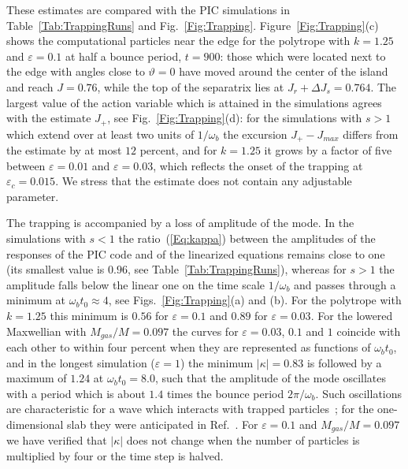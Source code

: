 These estimates are compared with the PIC simulations in Table~\ref{Tab:TrappingRuns} and Fig.~\ref{Fig:Trapping}. Figure~\ref{Fig:Trapping}(c) shows the computational particles near the edge for the polytrope with $k = 1.25$ and $\varepsilon = 0.1$ at half a bounce period, $t = 900$: those which were located next to the edge with angles close to $\vartheta = 0$ have moved around the center of the island and reach $J = 0.76$, while the top of the separatrix lies at $J_r + \Delta J_s = 0.764$. The largest value of the action variable which is attained in the simulations agrees with the estimate $J_+$, see Fig.~\ref{Fig:Trapping}(d): for the simulations with $s > 1$ which extend over at least two units of $1/\omega_b$ the excursion $J_+ - J_{max}$ differs from the estimate by at most $12$ percent, and for $k = 1.25$ it grows by a factor of five between $\varepsilon = 0.01$ and $\varepsilon = 0.03$, which reflects the onset of the trapping at $\varepsilon_c = 0.015$. We stress that the estimate does not contain any adjustable parameter.

The trapping is accompanied by a loss of amplitude of the mode. In the simulations with $s < 1$ the ratio~(\ref{Eq:kappa}) between the amplitudes of the responses of the PIC code and of the linearized equations remains close to one (its smallest value is $0.96$, see Table~\ref{Tab:TrappingRuns}), whereas for $s > 1$ the amplitude falls below the linear one on the time scale $1/\omega_b$ and passes through a minimum at $\omega_b t_0\approx 4$, see Figs.~\ref{Fig:Trapping}(a) and (b). For the polytrope with $k = 1.25$ this minimum is $0.56$ for $\varepsilon = 0.1$ and $0.89$ for $\varepsilon = 0.03$. For the lowered Maxwellian with $M_{gas}/M = 0.097$ the curves for $\varepsilon = 0.03$, $0.1$ and $1$ coincide with each other to within four percent when they are represented as functions of $\omega_b t_0$, and in the longest simulation ($\varepsilon = 1$) the minimum $|\kappa| = 0.83$ is followed by a maximum of $1.24$ at $\omega_b t_0 = 8.0$, such that the amplitude of the mode oscillates with a period which is about $1.4$ times the bounce period $2\pi/\omega_b$. Such oscillations are characteristic for a wave which interacts with trapped particles~\cite{tO65}; for the one-dimensional slab they were anticipated in Ref.~\cite{pL92}. For $\varepsilon = 0.1$ and $M_{gas}/M = 0.097$ we have verified that $|\kappa|$ does not change when the number of particles is multiplied by four or the time step is halved.


